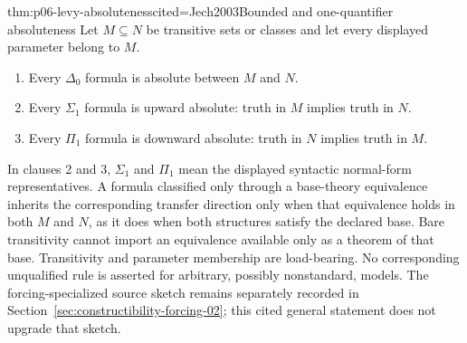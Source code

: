 \begin{hbtheorem}{thm:p06-levy-absoluteness}{cited=Jech2003}{Bounded and one-quantifier absoluteness}
Let \(M\subseteq N\) be transitive sets or classes and let every displayed
parameter belong to \(M\).
\begin{enumerate}
  \item Every \(\Delta_0\) formula is absolute between \(M\) and \(N\).
  \item Every \(\Sigma_1\) formula is upward absolute: truth in \(M\)
        implies truth in \(N\).
  \item Every \(\Pi_1\) formula is downward absolute: truth in \(N\)
        implies truth in \(M\).
\end{enumerate}
In clauses 2 and 3, \(\Sigma_1\) and \(\Pi_1\) mean the displayed syntactic
normal-form representatives.  A formula classified only through a
base-theory equivalence inherits the corresponding transfer direction only
when that equivalence holds in both \(M\) and \(N\), as it does when both
structures satisfy the declared base.  Bare transitivity cannot import an
equivalence available only as a theorem of that base.
Transitivity and parameter membership are load-bearing.  No corresponding
unqualified rule is asserted for arbitrary, possibly nonstandard, models.
The forcing-specialized source sketch remains separately recorded in
Section~\ref{sec:constructibility-forcing-02}; this cited general statement
does not upgrade that sketch.
\end{hbtheorem}

